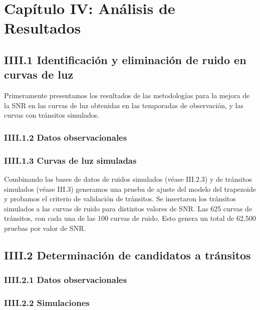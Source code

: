 \chapter*{\textbf{Capítulo IV: Análisis de Resultados}}

\section*{IIII.1 Identificación y eliminación de ruido en curvas de luz}

Primeramente presentamos los resultados de las metodologías para la mejora de la SNR en las curvas de luz obtenidas en las temporadas de observación, y las curvas con tránsitos simulados.

\subsection*{IIII.1.2 Datos observacionales}




\subsection*{IIII.1.3 Curvas de luz simuladas}

Combinando las bases de datos de ruidos simulados (véase III.2.3) y de tránsitos simulados (véase III.3) generamos una prueba de ajuste del modelo del trapezoide y probamos el criterio de validación de tránsitos. Se insertaron los tránsitos simulados a las curvas de ruido para distintos valores de SNR. Las 625 curvas de tránsitos, con cada una de las 100 curvas de ruido. Esto genera un total de 62,500 pruebas por valor de SNR.



\section*{IIII.2 Determinación de candidatos a tránsitos}





\subsection*{IIII.2.1 Datos observacionales}

\subsection*{IIII.2.2 Simulaciones}


